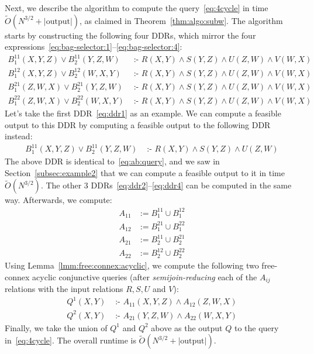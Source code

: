 \documentclass{theoretics}
\newcommand{\cd}{\text{ :- }}
\begin{document}
    Next, we describe the algorithm to compute the query~\eqref{eq:4cycle} in time
    $\tilde O(N^{3/2} + |\text{output}|)$, as claimed in Theorem~\ref{thm:algo:subw}.
    The algorithm starts by constructing the following four DDRs, which mirror the four
    expressions~\eqref{eq:bag-selector:1}--\eqref{eq:bag-selector:4}:
    \begin{align}
        B_1^{11}(X,Y,Z) \vee B_2^{11}(Y,Z,W) & \cd
            R(X,Y) \wedge S(Y,Z) \wedge U(Z,W) \wedge V(W,X) \label{eq:ddr1}\\
        B_1^{12}(X,Y,Z) \vee B_2^{12}(W,X,Y) & \cd
            R(X,Y) \wedge S(Y,Z) \wedge U(Z,W) \wedge V(W,X) \label{eq:ddr2}\\
        B_1^{21}(Z,W,X) \vee B_2^{21}(Y,Z,W) & \cd
            R(X,Y) \wedge S(Y,Z) \wedge U(Z,W) \wedge V(W,X) \label{eq:ddr3}\\
        B_1^{22}(Z,W,X) \vee B_2^{22}(W,X,Y) & \cd
            R(X,Y) \wedge S(Y,Z) \wedge U(Z,W) \wedge V(W,X) \label{eq:ddr4}
    \end{align}
    Let's take the first DDR~\eqref{eq:ddr1} as an example. We can compute a feasible output
    to this DDR by computing a feasible output to the following DDR instead:
    \begin{align*}
        B_1^{11}(X,Y,Z) \vee B_2^{11}(Y,Z,W) & \cd
            R(X,Y) \wedge S(Y,Z) \wedge U(Z,W)
    \end{align*}
    The above DDR is identical to~\eqref{eq:ab:query}, and we saw in Section~\ref{subsec:example2} that we can compute a feasible output to it in time $\tilde O(N^{3/2})$.
    The other 3 DDRs~\eqref{eq:ddr2}--\eqref{eq:ddr4} can be computed in the same way.
    Afterwards, we compute:
    \begin{align*}
        A_{11} & := B_1^{11} \cup B_1^{12} \\
        A_{12} & := B_1^{21} \cup B_1^{22} \\
        A_{21} & := B_2^{11} \cup B_2^{21} \\
        A_{22} & := B_2^{12} \cup B_2^{22}
    \end{align*}
    Using Lemma~\eqref{lmm:free:connex:acyclic}, we compute the following two free-connex acyclic conjunctive queries
    (after {\em semijoin-reducing} each of the $A_{ij}$ relations with the input relations $R, S, U$ and $V$):
    \begin{align*}
        Q^1(X, Y) & \cd A_{11}(X, Y, Z) \wedge A_{12}(Z, W, X) \\
        Q^2(X, Y) & \cd A_{21}(Y, Z, W) \wedge A_{22}(W, X, Y)
    \end{align*}
    Finally, we take the union of $Q^1$ and $Q^2$ above as the output $Q$ to the query in~\eqref{eq:4cycle}. The overall runtime is $\tilde O(N^{3/2} + |\text{output}|)$.
\end{document}
